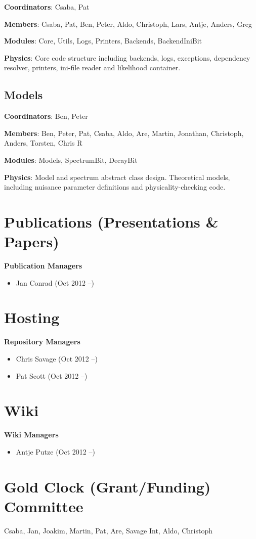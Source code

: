 \textbf{Coordinators}: Csaba, Pat

\textbf{Members}: Csaba, Pat, Ben, Peter, Aldo, Christoph, Lars, Antje, Anders, Greg

\textbf{Modules}: Core, Utils, Logs, Printers, Backends, BackendIniBit

\textbf{Physics}: Core code structure including backends, logs, exceptions, dependency resolver, printers, ini-file reader and likelihood container.


\subsection{Models}

\textbf{Coordinators}: Ben, Peter

\textbf{Members}: Ben, Peter, Pat, Csaba, Aldo, Are, Martin, Jonathan, Christoph, Anders, Torsten, Chris R

\textbf{Modules}: Models, SpectrumBit, DecayBit

\textbf{Physics}: Model and spectrum abstract class design. Theoretical models, including nuisance parameter definitions and physicality-checking code.


\section{Publications (Presentations \& Papers)}

\textbf{Publication Managers}
\begin{itemize}
\item Jan Conrad (Oct 2012 --)
\end{itemize}

\section{Hosting}

\textbf{Repository Managers}
\begin{itemize}
\item Chris Savage (Oct 2012 --)
\item Pat Scott (Oct 2012 --)
\end{itemize}

\section{Wiki}

\textbf{Wiki Managers}
\begin{itemize}
\item Antje Putze (Oct 2012 --)
\end{itemize}

\section{Gold Clock (Grant/Funding) Committee}
Csaba, Jan, Joakim, Martin, Pat, Are, Savage Int, Aldo, Christoph


